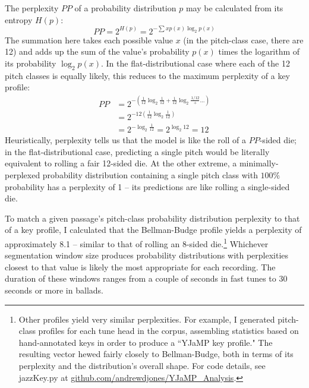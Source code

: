 The perplexity $PP$ of a probability distribution $p$ may be calculated from its entropy $H(p)$:
\begin{equation}
PP = 2^{H(p)} = 2^{-\sum{x} p(x) \log_2 p(x)}
\end{equation}
The summation here takes each possible value $x$ (in the pitch-class case, there are 12) and adds up the sum of the value's probability $p(x)$ times the logarithm of its probability $\log_2 p(x)$.  In the flat-distributional case where each of the 12 pitch classes is equally likely, this reduces to the maximum perplexity of a key profile:
\begin{align*}
PP &= 2^{-(\frac{1}{12} \log_2 \frac{1}{12} + \frac{1}{12} \log_2 \frac{1/12} + ...)} \\
 &= 2^{-12(\frac{1}{12} \log_2 \frac{1}{12})} \\
 &= 2^{-\log_2 \frac{1}{12}} = 2^{\log_2 12} = 12
\end{align*}
Heuristically, perplexity tells us that the model is like the roll of a $PP$-sided die; in the flat-distributional case, predicting a single pitch would be literally equivalent to rolling a fair 12-sided die.  At the other extreme, a minimally-perplexed probability distribution containing a single pitch class with $100\%$ probability has a perplexity of 1 -- its predictions are like rolling a single-sided die.

To match a given passage's pitch-class probability distribution perplexity to that of a key profile, I calculated that the Bellman-Budge profile yields a perplexity of approximately 8.1 -- similar to that of rolling an 8-sided die.\footnote{Other profiles yield very similar perplexities.  For example, I generated pitch-class profiles for each tune head in the corpus, assembling statistics based on hand-annotated keys in order to produce a ``YJaMP key profile."  The resulting vector hewed fairly closely to Bellman-Budge, both in terms of its perplexity and the distribution's overall shape.  For code details, see jazzKey.py at \href{github.com/andrewdjones/YJaMP_Analysis}{github.com/andrewdjones/YJaMP_Analysis}.}  Whichever segmentation window size produces probability distributions with perplexities closest to that value is likely the most appropriate for each recording.  The duration of these windows ranges from a couple of seconds in fast tunes to 30 seconds or more in ballads.

